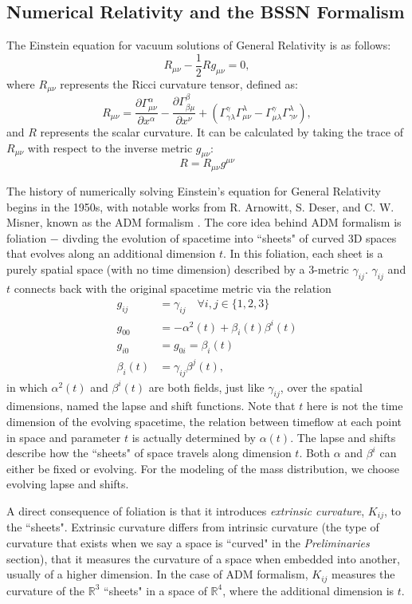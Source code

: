 \documentclass[conference]{IEEEtran}
\begin{document}
\subsection{Numerical Relativity and the BSSN Formalism}\label{AA}
The Einstein equation for vacuum solutions of General Relativity is as 
follows:
\[
R_{\mu\nu} - \frac{1}{2}Rg_{\mu\nu} = 0,
\tag{9}
\]
where $R_{\mu\nu}$ represents the Ricci curvature tensor, defined as:
\[
R_{\mu\nu} = \frac{\partial \Gamma^\alpha_{\mu\nu}}{\partial x^\alpha} - 
\frac{\partial \Gamma^\beta_{\beta\mu}}{\partial x^\nu} + 
(\Gamma^\gamma_{\gamma\lambda} \Gamma^\lambda_{\mu\nu} - 
\Gamma^\gamma_{\mu\lambda} \Gamma^\lambda_{\gamma\nu}),
\tag{10}
\]
and $R$ represents the scalar curvature. It can be calculated by taking 
the trace of $R_{\mu\nu}$ with respect to the inverse metric $g_{\mu\nu}$:
\[
R = R_{\mu\nu}g^{\mu\nu}
\]

The history of numerically solving Einstein's equation for General Relativity 
begins in the 1950s, with notable works from R. Arnowitt, S. Deser, and 
C. W. Misner, known as the ADM formalism \cite{ADM}\cite{ADM+}. The core idea behind 
ADM formalism is foliation $-$ divding the evolution of spacetime into ``sheets" of 
curved 3D spaces that evolves along an additional dimension $t$. In this foliation, 
each sheet is a purely spatial space (with no time dimension) described by a 3-metric 
$\gamma_{ij}$. $\gamma_{ij}$ and $t$ connects back with the original spacetime metric via 
the relation
\begin{align*}
g_{ij} &= \gamma_{ij} \quad \forall i, j \in \{1, 2, 3\} \\
g_{00} &= -\alpha^2(t) + \beta_i(t)\beta^i(t) \\
g_{i0} &= g_{0i} = \beta_i(t) \\
\beta_i(t) &= \gamma_{ij}\beta^j(t),
\end{align*}
in which $\alpha^2(t)$ and $\beta^i(t)$ are both fields, just like $\gamma_{ij}$, over 
the spatial dimensions, named the lapse and shift functions. Note that 
$t$ here is not the time dimension of the evolving spacetime, the relation between timeflow 
at each point in space and parameter $t$ is actually determined by $\alpha(t)$. 
The lapse and shifts describe how the ``sheets" of space travels along dimension $t$. 
Both $\alpha$ and $\beta^i$ can either be fixed or evolving. For the modeling of the 
mass distribution, we choose evolving lapse and shifts.

A direct consequence of foliation is that it introduces \textit{extrinsic curvature}, $K_{ij}$,  
to the ``sheets". Extrinsic curvature differs from intrinsic curvature (the type of 
curvature that exists when we say a space is ``curved" in the \textit{Preliminaries} section), that it measures the curvature 
of a space when embedded into another, usually of a higher dimension. In the case of ADM 
formalism, $K_{ij}$ measures the curvature of the $\mathbb{R}^3$ ``sheets" in a space of $\mathbb{R}^4$, 
where the additional dimension is $t$. 
\end{document}
